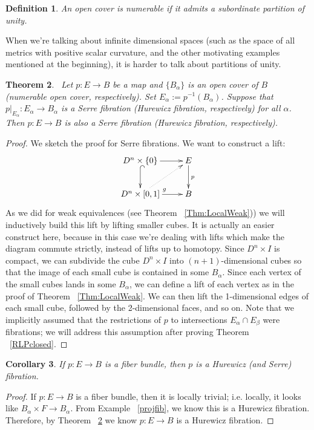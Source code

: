 \documentclass{article}
\newtheorem{theorem}{Theorem}[section]
\newtheorem{corollary}[theorem]{Corollary}
\newtheorem{definition}[theorem]{Definition}
\newtheorem{proposed work}[theorem]{Proposed Work}
\newcommand{\xymat}[1]{\begin{align*}\xymatrix{ #1}\end{align*}}
\begin{document}
\begin{definition}
An open cover is numerable if it admits a subordinate partition of unity.
\end{definition}

When we're talking about infinite dimensional spaces (such as the space of all metrics with positive scalar curvature, and the other motivating examples mentioned at the beginning), it is harder to talk about partitions of unity. 


\begin{theorem}~\label{fibcov}
Let $p:E\to B$ be a map and $\lbrace B_\alpha\rbrace$ is an open cover of $B$ (numerable open cover, respectively). Set $E_\alpha:=p^{-1}(B_\alpha)$. Suppose that $p|_{E_\alpha} : E_\alpha \to B_\alpha$ is a Serre fibration (Hurewicz fibration, respectively) for all $\alpha$. Then $p:E\to B$ is also a Serre fibration (Hurewicz fibration, respectively). 
\end{theorem}

\begin{proof}
We sketch the proof for Serre fibrations. We want to construct a lift: 
\xymat{D^n\times \lbrace 0\rbrace \ar[r] \ar@{^{(}->}[d] & E \ar[d]^p \\ D^n\times [0,1] \ar[r]^g \ar@{.>}[ur] & B}
As we did for weak equivalences (see Theorem ~\ref{Thm:LocalWeak})) we will inductively build this lift by lifting smaller cubes. It is actually an easier construct here, because in this case we're dealing with lifts which make the diagram commute strictly, instead of lifts up to homotopy. Since $D^n \times I$ is compact, we can subdivide the cube $D^n \times I$ into $(n+1)$-dimensional cubes so that the image of each small cube is contained in some $B_\alpha$. Since each vertex of the small cubes lands in some $B_\alpha$, we can define a lift of each vertex as in the proof of Theorem ~\ref{Thm:LocalWeak}. We can then lift the 1-dimensional edges of each small cube, followed by the 2-dimensional faces, and so on. Note that we implicitly assumed that the restrictions of $p$ to intersections $E_\alpha \cap E_\beta$ were fibrations; we will address this assumption after proving Theorem ~\ref{RLPclosed}.
\end{proof}

\begin{corollary}
If $p:E\to B$ is a fiber bundle, then $p$ is a Hurewicz (and Serre) fibration.
\end{corollary}
\begin{proof}
If $p:E\to B$ is a fiber bundle, then it is locally trivial; i.e. locally, it looks like $B_\alpha\times F\to B_\alpha$. From Example ~\ref{projfib}, we know this is a Hurewicz fibration. Therefore, by Theorem ~\ref{fibcov} we know $p:E\to B$ is a Hurewicz fibration.
\end{proof}
\end{document}
